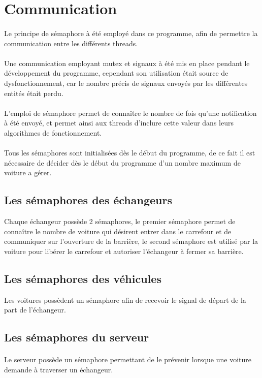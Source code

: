 \documentclass{report}
\begin{document}
	\section{Communication}
	\paragraph{}
	Le principe de sémaphore à été employé dans ce programme, afin de permettre la communication entre les différents threads. 
	\paragraph{}
	Une communication employant mutex et signaux à été mis en place pendant le développement du programme, cependant son utilisation était source de dysfonctionnement, car le nombre précis de signaux envoyés par les différentes entités était perdu.
	\paragraph{}
	L'emploi de sémaphore permet de connaître le nombre de fois qu'une notification à été envoyé, et permet ainsi aux threads d'inclure cette valeur dans leurs algorithmes de fonctionnement.
	\paragraph{}
	Tous les sémaphores sont initialisées dès le début du programme, de ce fait il est nécessaire de décider dès le début du programme d'un nombre maximum de voiture a gérer.
	
			\subsection{Les sémaphores des échangeurs}
			Chaque échangeur possède 2 sémaphores, le premier sémaphore permet de connaître le nombre de voiture qui désirent entrer dans le carrefour et de communiquer sur l'ouverture de la barrière, le second sémaphore est utilisé par la voiture pour libérer le carrefour et autoriser l'échangeur à fermer sa barrière.

			\subsection{Les sémaphores des véhicules}
			Les voitures possèdent un sémaphore afin de recevoir le signal de départ de la part de l’échangeur. 

			\subsection{Les sémaphores du serveur}
			\paragraph{}
			Le serveur possède un sémaphore permettant de le prévenir lorsque une voiture demande à traverser un échangeur.
		
		
	
\end{document}

